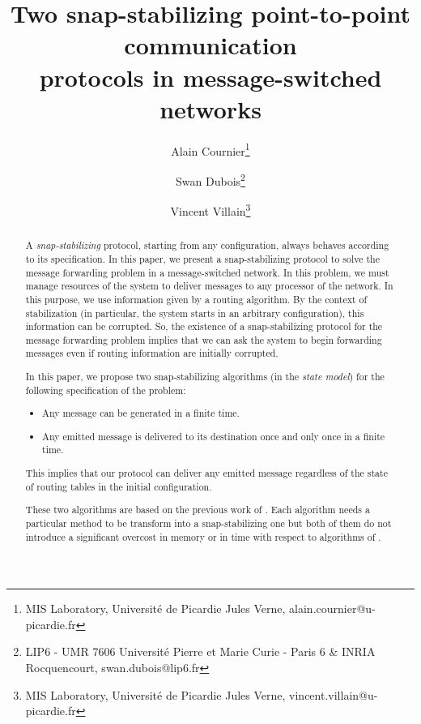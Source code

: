 \documentclass[11pt]{article}
\date{}
\begin{document}
\newcommand{\AN}{$\mathcal{SSMFP}_{1}$~}
\newcommand{\AD}{$\mathcal{SSMFP}_{2}$~}



\title{Two snap-stabilizing point-to-point communication\\ protocols in message-switched networks}

\author{
Alain Cournier\thanks{MIS Laboratory, Universit\'e de Picardie Jules Verne, alain.cournier@u-picardie.fr}
\and 
Swan Dubois\thanks{LIP6 - UMR 7606 Universit\'e Pierre et Marie Curie - Paris 6 \& INRIA Rocquencourt, swan.dubois@lip6.fr}
\and
Vincent Villain\thanks{MIS Laboratory, Universit\'e de Picardie Jules Verne, vincent.villain@u-picardie.fr}
}

\maketitle



\begin{abstract}
A \emph{snap-stabilizing} protocol, starting from any configuration, always behaves according to its specification. In this paper, we present a snap-stabilizing protocol to solve the message forwarding problem in a message-switched network. In this problem, we must manage resources of the system to deliver messages to any processor of the network. In this purpose, we use information given by a routing algorithm. By the context of stabilization (in particular, the system starts in an arbitrary configuration), this information can be corrupted. So, the existence of a snap-stabilizing protocol for the message forwarding problem implies that we can ask the system to begin forwarding messages even if routing information are initially corrupted.

In this paper, we propose two snap-stabilizing algorithms (in the \emph{state model}) for the following specification of the problem:
\begin{itemize}
	\item Any message can be generated in a finite time.
	\item Any emitted message is delivered to its destination once and only once in a finite time.
\end{itemize}
This implies that our protocol can deliver any emitted message regardless of the state of routing tables in the initial configuration.

These two algorithms are based on the previous work of \cite{MS78}. Each algorithm needs a particular method to be transform into a snap-stabilizing one but both of them do not introduce a significant overcost in memory or in time with respect to algorithms of \cite{MS78}.
\end{abstract}
\end{document}
